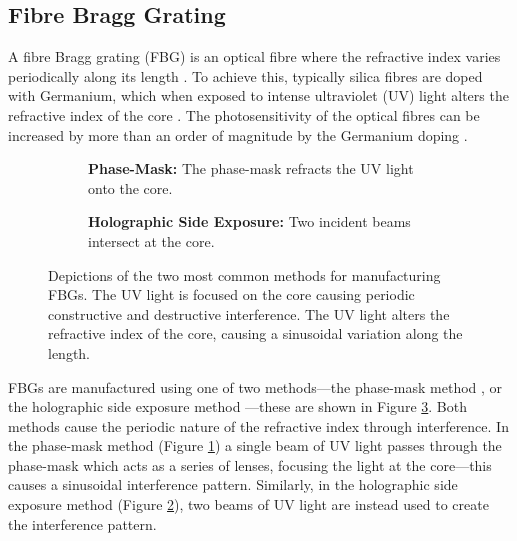 \subsection{Fibre Bragg Grating}
A fibre Bragg grating (FBG) is an optical fibre where the refractive index varies periodically along its length \cite{ferreira}. To achieve this, typically silica fibres are doped with Germanium, which when exposed to intense ultraviolet (UV) light alters the refractive index of the core \cite{becker, starodoumov}. The photosensitivity of the optical fibres can be increased by more than an order of magnitude by the Germanium doping \cite{becker, ferreira}. \\

\begin{figure}[p]
\centering
\begin{subfigure}{\textwidth}
\centering

\caption{\textbf{Phase-Mask:} The phase-mask refracts the UV light onto the core.}
\label{fig:phasemask}
\vspace{10mm}
\end{subfigure}
\begin{subfigure}{\textwidth}
\centering

\caption{\textbf{Holographic Side Exposure:} Two incident beams intersect at the core.}
\label{fig:holographic}
\end{subfigure}
\caption[Manufacture methods of fibre Bragg gratings.]{Depictions of the two most common methods for manufacturing FBGs. The UV light is focused on the core causing periodic constructive and destructive interference. The UV light alters the refractive index of the core, causing a sinusoidal variation along the length.}
\label{fig:fbgmake}
\end{figure}

FBGs are manufactured using one of two methods---the phase-mask method \cite{agrawal2002, alazzawi, becker, starodoumov}, or the holographic side exposure method \cite{agrawal2002, alazzawi, becker, ferreira, starodoumov}---these are shown in Figure \ref{fig:fbgmake}. Both methods cause the periodic nature of the refractive index through interference. In the phase-mask method (Figure \ref{fig:phasemask}) a single beam of UV light passes through the phase-mask which acts as a series of lenses, focusing the light at the core---this causes a sinusoidal interference pattern. Similarly, in the holographic side exposure method (Figure \ref{fig:holographic}), two beams of UV light are instead used to create the interference pattern. \\

